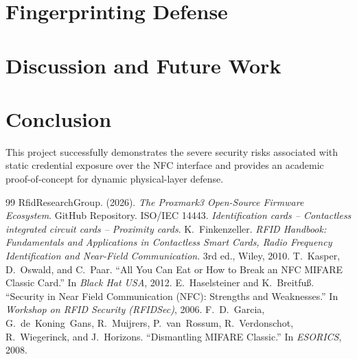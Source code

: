 \documentclass[sigconf]{acmart}
\begin{document}
\section{Fingerprinting Defense}
\label{sec:Blue part}

\section{Discussion and Future Work}
\label{sec:discussion}



\section{Conclusion}
This project successfully demonstrates the severe security risks associated with static credential exposure over the NFC interface and provides an academic proof-of-concept for dynamic physical-layer defense. 

\begin{thebibliography}{99}
 RfidResearchGroup. (2026). \emph{The Proxmark3 Open-Source Firmware Ecosystem}. GitHub Repository.
 ISO/IEC 14443. \emph{Identification cards -- Contactless integrated circuit cards -- Proximity cards}.
 K.~Finkenzeller. \emph{RFID Handbook: Fundamentals and Applications in Contactless Smart Cards, Radio Frequency Identification and Near-Field Communication}. 3rd ed., Wiley, 2010.
 T.~Kasper, D.~Oswald, and C.~Paar. ``All You Can Eat or How to Break an NFC MIFARE Classic Card.'' In \emph{Black Hat USA}, 2012.
 E.~Haselsteiner and K.~Breitfu\ss. ``Security in Near Field Communication (NFC): Strengths and Weaknesses.'' In \emph{Workshop on RFID Security (RFIDSec)}, 2006.
 F.~D.~Garcia, G.~de~Koning~Gans, R.~Muijrers, P.~van~Rossum, R.~Verdonschot, R.~Wiegerinck, and J.~Horizons. ``Dismantling MIFARE Classic.'' In \emph{ESORICS}, 2008.
\end{thebibliography}
\end{document}
